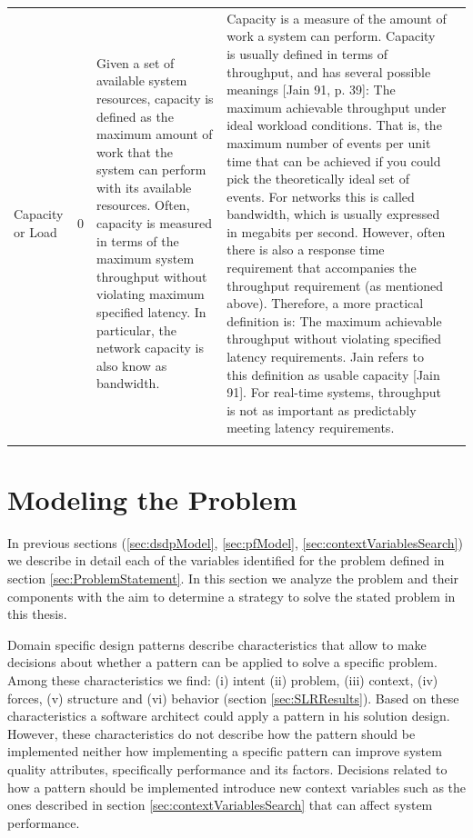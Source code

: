 {\begin{longtable}[c]{|p{0.9in}|c|p{2.3in}|p{2.3in}|c}
	\centering	Capacity or Load                       & 0     & Given a set of available system resources, capacity is defined as the maximum amount of work  that the system can perform with its available resources. Often, capacity   is measured in terms of the maximum system throughput without violating maximum specified latency. In particular, the network capacity is also know   as bandwidth.                                                                                      & Capacity is a   measure of the amount of work a system can perform. Capacity is usually   defined in terms of throughput, and has several possible meanings {[}Jain 91,   p. 39{]}:     The maximum achievable throughput under ideal workload conditions. That is,   the maximum number of events per unit time that can be achieved if you could   pick the theoretically ideal set of events. For networks this is called   bandwidth, which is usually expressed in megabits per second.     However, often there is also a response time requirement that accompanies   the throughput requirement (as mentioned above). Therefore, a more practical   definition is:     The maximum achievable throughput without violating specified latency   requirements. Jain refers to this definition as usable capacity {[}Jain 91{]}. For real-time   systems, throughput is not as important as predictably meeting latency   requirements.
	& \\ \hhline{|-|-|-|-|}
	
\end{longtable}
}
\section{Modeling the Problem}
In previous sections (\ref{sec:dsdpModel}, \ref{sec:pfModel}, \ref{sec:contextVariablesSearch}) we describe in detail each of the variables identified for the problem defined in section \ref{sec:ProblemStatement}. In this section we analyze the problem and their components with the aim to determine a strategy to solve the stated problem in this thesis.

Domain specific design patterns describe characteristics that allow to make decisions about whether a pattern can be applied to solve a specific problem. Among these characteristics we find: (i) intent (ii) problem, (iii) context, (iv) forces, (v) structure and (vi) behavior (section \ref{sec:SLRResults}). Based on these characteristics a software architect could  apply a pattern in his solution design. However, these characteristics do not describe how the pattern should be implemented neither how implementing a specific pattern can improve system quality attributes, specifically performance and its factors. Decisions related to how a pattern should be implemented introduce new context variables such as the ones described in section \ref{sec:contextVariablesSearch} that can affect system performance. 

